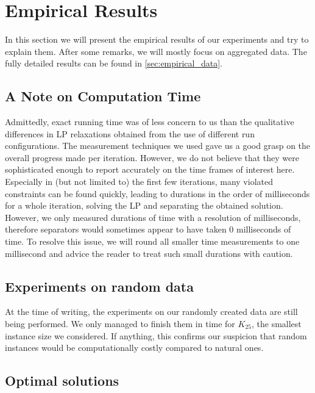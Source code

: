 \section{Empirical Results}\label{sec:empirical_results}
In this section we will present the empirical results of our experiments and try to explain them.
After some remarks, we will mostly focus on aggregated data.
The fully detailed results can be found in \cref{sec:empirical_data}.

\subsection{A Note on Computation Time}
Admittedly, exact running time was of less concern to us than the qualitative differences in LP relaxations obtained from the use of different run configurations.
The measurement techniques we used gave us a good grasp on the overall progress made per iteration.
However, we do not believe that they were sophisticated enough to report accurately on the time frames of interest here.
Especially in (but not limited to) the first few iterations, many violated constraints can be found quickly,
leading to durations in the order of milliseconds for a whole iteration, \ie solving the LP and separating the obtained solution.
However, we only measured durations of time with a resolution of milliseconds, therefore separators would sometimes appear to have taken 0 milliseconds of time.
To resolve this issue, we will round all smaller time measurements to one millisecond and advice the reader to treat such small durations with caution.

\subsection{Experiments on random data}
At the time of writing, the experiments on our randomly created data are still being performed.
We only managed to finish them in time for $K_{25}$, the smallest instance size we considered.
If anything, this confirms our suspicion that random instances would be computationally costly compared to natural ones.

\subsection{Optimal solutions}\label{subsec:optimal_solutions}

